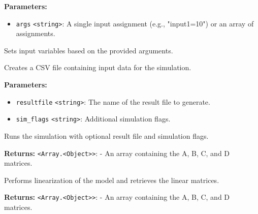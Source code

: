 \documentclass[12pt,a4paper]{article}
\begin{document}
\noindent \textbf{Parameters:}
\begin{itemize}
  \item \texttt{args} \texttt{<string>}: A single input assignment (e.g., "input1=10") or an array of assignments.
\end{itemize}

\noindent Sets input variables based on the provided arguments.

\vspace{5mm}
\noindent {}


\noindent Creates a CSV file containing input data for the simulation.

\vspace{5mm}
\noindent {}


\noindent \textbf{Parameters:}
\begin{itemize}
  \item \texttt{resultfile} \texttt{<string>}: The name of the result file to generate.
  \item \texttt{sim\_flags} \texttt{<string>}: Additional simulation flags.
\end{itemize}

\noindent Runs the simulation with optional result file and simulation flags.

\vspace{5mm}
\noindent {}


\noindent \textbf{Returns:} \texttt{<Array.<Object>>}: - An array containing the A, B, C, and D matrices.

\noindent Performs linearization of the model and retrieves the linear matrices.

\vspace{5mm}
\noindent {}


\noindent \textbf{Returns:} \texttt{<Array.<Object>>}: - An array containing the A, B, C, and D matrices.
\end{document}
